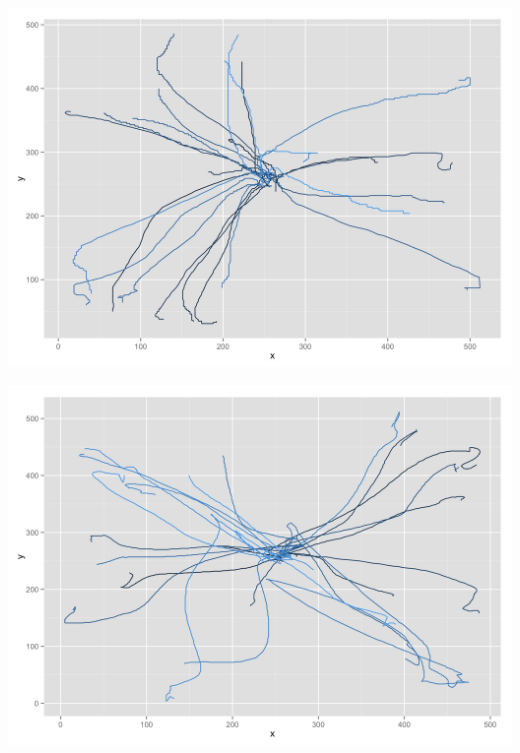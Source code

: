 \begin{appendices}
\begin{minipage}{\textwidth}
\begin{minipage}{0.5\linewidth}
	\end{minipage}
		\begin{minipage}{0.5\linewidth}
		\includegraphics[width=\linewidth]{images/plots/plot_analysis_qualitative_72}
	\end{minipage}
	\begin{minipage}{0.5\linewidth}
		\includegraphics[width=\linewidth]{images/plots/plot_analysis_qualitative_151}
	\end{minipage}
	\begin{minipage}{0.5\linewidth}

\end{minipage}
\end{minipage}
\end{appendices}

